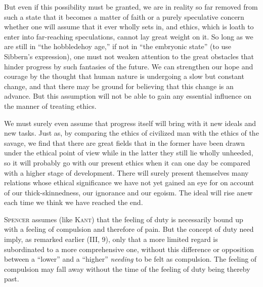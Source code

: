 \documentclass[12pt,a4paper,openany]{book}
\newcommand{\opage}[1]{\marginnote{\footnotesize\textit{[#1]}}}
\begin{document}
But even if this possibility must be granted, we are in reality so far removed from such a state that
it becomes a matter of faith or a purely speculative concern whether one will assume that it ever wholly
sets in, and ethics, which is loath to enter into far-reaching speculations, cannot lay great weight on
it. So long as we are still in ``the hobbledehoy age,'' if not in ``the embryonic state'' (to use
Sibbern's
\opage{104}expression), one must not weaken attention to the great obstacles that hinder progress by such
fantasies of the future. We can strengthen our hope and courage by the thought that human nature is
undergoing a slow but constant change, and that there may be ground for believing that this change is an
advance. But this assumption will not be able to gain any essential influence on the manner of treating
ethics.

We must surely even assume that progress itself will bring with it new ideals and new tasks. Just as, by
comparing the ethics of civilized man with the ethics of the savage, we find that there are great fields
that in the former have been drawn under the ethical point of view while in the latter they still lie
wholly unheeded, so it will probably go with our present ethics when it can one day be compared with a
higher stage of development. There will surely present themselves many relations whose ethical
significance we have not yet gained an eye for on account of our thick-skinnedness, our ignorance and our
egoism. The ideal will rise anew each time we think we have reached the end.

\textsc{Spencer} assumes (like \textsc{Kant}) that the feeling of duty is necessarily bound up with a
feeling of compulsion and therefore of pain. But the concept of duty need imply, as remarked earlier
(III, 9), only that a more limited regard is subordinated to a more comprehensive one, without this
difference or opposition between a ``lower'' and a ``higher'' \textit{needing} to be felt as compulsion.
The feeling of compulsion may fall away without the time of the feeling of duty being thereby past.
\end{document}
